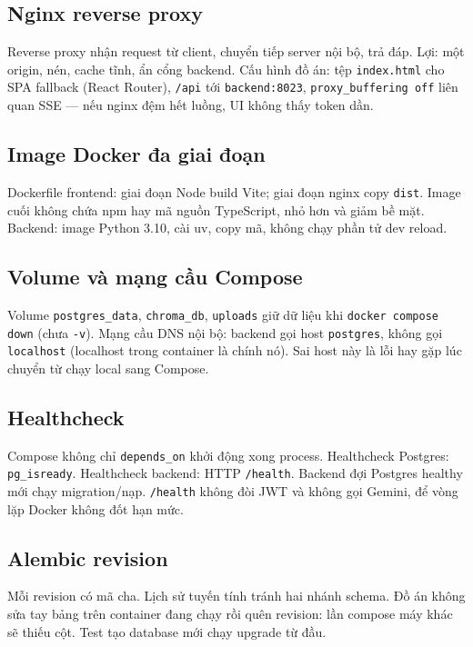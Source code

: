 \subsection{Nginx reverse proxy}

Reverse proxy nhận request từ client, chuyển tiếp server nội bộ, trả đáp. Lợi:
một origin, nén, cache tĩnh, ẩn cổng backend. Cấu hình đồ án: tệp
\texttt{index.html} cho SPA fallback (React Router), \texttt{/api} tới
\texttt{backend:8023}, \texttt{proxy\_buffering off} liên quan SSE --- nếu nginx
đệm hết luồng, UI không thấy token dần.

\subsection{Image Docker đa giai đoạn}

Dockerfile frontend: giai đoạn Node build Vite; giai đoạn nginx copy
\texttt{dist}. Image cuối không chứa npm hay mã nguồn TypeScript, nhỏ hơn và
giảm bề mặt. Backend: image Python 3.10, cài uv, copy mã, không chạy phần tử
dev reload.

\subsection{Volume và mạng cầu Compose}

Volume \texttt{postgres\_data}, \texttt{chroma\_db}, \texttt{uploads} giữ dữ liệu
khi \texttt{docker compose down} (chưa \texttt{-v}). Mạng cầu DNS nội bộ: backend
gọi host \texttt{postgres}, không gọi \texttt{localhost} (localhost trong
container là chính nó). Sai host này là lỗi hay gặp lúc chuyển từ chạy local
sang Compose.

\subsection{Healthcheck}

Compose không chỉ \texttt{depends\_on} khởi động xong process. Healthcheck
Postgres: \texttt{pg\_isready}. Healthcheck backend: HTTP \texttt{/health}.
Backend đợi Postgres healthy mới chạy migration/nạp. \texttt{/health} không đòi
JWT và không gọi Gemini, để vòng lặp Docker không đốt hạn mức.

\subsection{Alembic revision}

Mỗi revision có mã cha. Lịch sử tuyến tính tránh hai nhánh schema. Đồ án không
sửa tay bảng trên container đang chạy rồi quên revision: lần compose máy khác
sẽ thiếu cột. Test tạo database mới chạy upgrade từ đầu.

